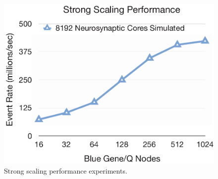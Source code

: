 \begin{figure}[t!]
\centering
\includegraphics[width=\linewidth]{result_img/strong_scale.pdf}
\caption{
	Strong scaling performance experiments.
}
\label{fig:strong}
\end{figure}
